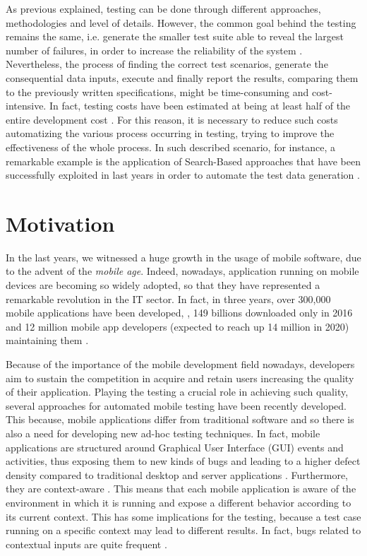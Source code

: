 As previous explained, testing can be done through different approaches, methodologies and level of details. However, the common goal behind the testing remains the same, i.e. generate the smaller test suite able to reveal the largest number of failures, in order to increase the reliability of the system \cite{grano}. 
Nevertheless, the process of finding the correct test scenarios, generate the consequential data inputs, execute and finally report the results, comparing them to the previously written specifications, might be time-consuming and cost-intensive. In fact, testing costs have been estimated at being at least half of the entire development cost \cite{Beizer:1990:STT:79060}. For this reason, it is necessary to reduce such costs automatizing the various process occurring in testing, trying to improve the effectiveness of the whole process. In such described scenario, for instance, a remarkable example is the application of Search-Based approaches that have been successfully exploited in last years in order to automate the test data generation \cite{Harman_et_al_2015}.

\section{Motivation}
In the last years, we witnessed a huge growth in the usage of mobile software, due to the advent of the \textit{mobile age}. Indeed, nowadays, application running on mobile devices are becoming so widely adopted, so that they have represented a remarkable revolution in the IT sector. In fact, in three years, over 300,000 mobile applications have been developed, \cite{muccini}, 149 billions downloaded only in 2016 \cite{statista} and 12 million mobile app developers (expected to reach up 14 million in 2020) maintaining them \cite{DevRelate}. 

Because of the importance of the mobile development field nowadays, developers aim to sustain the competition in acquire and retain users increasing the quality of their application. Playing the testing a crucial role in achieving such quality, several approaches for automated mobile testing have been recently developed. This because, mobile applications differ from traditional software and so there is also a need for developing new ad-hoc testing techniques. 
In fact, mobile applications are structured around Graphical User Interface (GUI) events and activities, thus exposing them to new kinds of bugs and leading to a higher defect density compared to traditional desktop and server applications \cite{Hu:2011:AGT:1982595.1982612}. Furthermore, they are context-aware \cite{muccini}. 
This means that each mobile application is aware of the environment in which it is running and expose a different behavior according to its current context. This has some implications for the testing, because a test case running on a specific context may lead to different results. In fact, bugs related to contextual inputs are quite frequent \cite{muccini}. 


